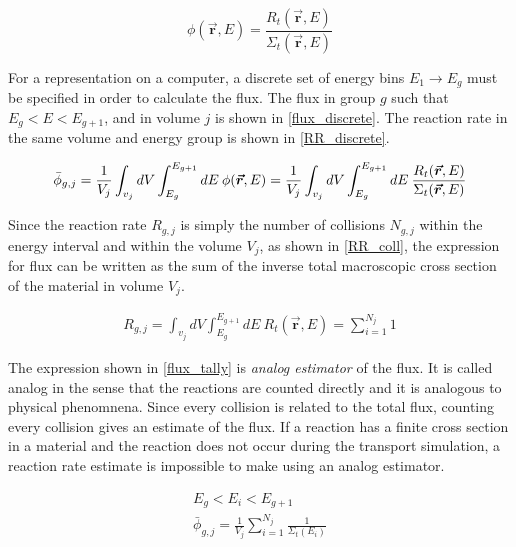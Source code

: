 \begin{equation}
\label{flux_from_RR}
\phi(\boldsymbol{\vec{r}},E) = \frac{ R_t(\boldsymbol{\vec{r}},E) }{  \Sigma_t(\boldsymbol{\vec{r}},E) }
\end{equation}

For a representation on a computer, a discrete set of energy bins $E_1 \rightarrow E_g$ must be specified in order to calculate the flux.  The flux in group $g$ such that $E_g < E < E_{g+1}$, and in volume $j$ is shown in \eqref{flux_discrete}.  The reaction rate in the same volume and energy group is shown in \eqref{RR_discrete}.

\begin{equation}
\label{RR_discrete}
\bar{\phi}_{g,j} = \frac{1}{V_j} \int_{v_j} dV \int_{E_g}^{E_{g+1}} dE \: \phi(\boldsymbol{\vec{r}},E) = \frac{1}{V_j} \int_{v_j} dV \int_{E_g}^{E_{g+1}} dE \:\frac{ R_t(\boldsymbol{\vec{r}},E) }{  \Sigma_t(\boldsymbol{\vec{r}},E) } \\
\end{equation}

Since the reaction rate $R_{g,j}$ is simply the number of collisions $N_{g,j}$ within the energy interval and within the volume $V_j$, as shown in \eqref{RR_coll}, the expression for flux can be written as the sum of the inverse total macroscopic cross section of the material in volume $V_j$.

\begin{equation}
\label{RR_coll}
\begin{gathered}
R_{g,j} = \int_{v_j} dV \int_{E_g}^{E_{g+1}} dE \: R_t(\boldsymbol{\vec{r}},E) = \sum_{i=1}^{N_j} 1
\end{gathered}
\end{equation}

The expression shown in \eqref{flux_tally} is \emph{analog estimator} of the flux.  It is called analog in the sense that the reactions are counted directly and it is analogous to physical phenomnena.  Since every collision is related to the total flux, counting every collision gives an estimate of the flux.  If a reaction has a finite cross section in a material and the reaction does not occur during the transport simulation, a reaction rate estimate is impossible to make using an analog estimator. 

\begin{equation}
\label{flux_tally}
\begin{gathered}
E_g < E_i < E_{g+1} \\
\bar{\phi}_{g,j} =  \frac{1}{V_j} \sum_{i=1}^{N_j} \frac{1}{\Sigma_t(E_i)}
\end{gathered}
\end{equation}

